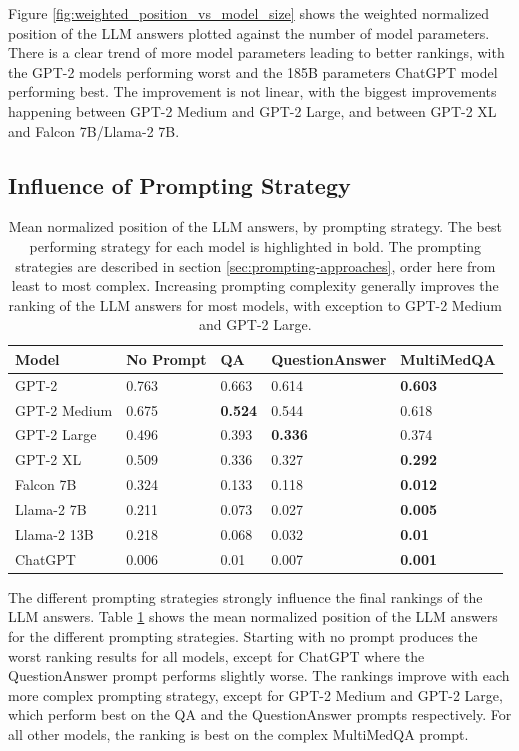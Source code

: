 Figure \ref{fig:weighted_position_vs_model_size} shows the weighted normalized position of the LLM answers plotted against the number of model parameters.
There is a clear trend of more model parameters leading to better rankings, with the GPT-2 models performing worst and the 185B parameters ChatGPT model performing best.
The improvement is not linear, with the biggest improvements happening between GPT-2 Medium and GPT-2 Large, and between GPT-2 XL and Falcon 7B/Llama-2 7B.


\subsection{Influence of Prompting Strategy}
\begin{table}[tb]
\centering
\begin{tabular}{lllll}
\hline
\textbf{Model}        & \textbf{No Prompt} & \textbf{QA}     & \textbf{QuestionAnswer} & \textbf{MultiMedQA} \\\hline
GPT-2        & 0.763      & 0.663 & 0.614    & \textbf{0.603}      \\
GPT-2 Medium & 0.675      & \textbf{0.524} & 0.544    & 0.618      \\
GPT-2 Large  & 0.496      & 0.393 & \textbf{0.336}    & 0.374      \\
GPT-2 XL     & 0.509      & 0.336 & 0.327    & \textbf{0.292}      \\
Falcon 7B    & 0.324      & 0.133 & 0.118    & \textbf{0.012}      \\
Llama-2 7B   & 0.211      & 0.073 & 0.027    & \textbf{0.005}      \\
Llama-2 13B  & 0.218      & 0.068 & 0.032    & \textbf{0.01 }      \\
ChatGPT      & 0.006      & 0.01  & 0.007    & \textbf{0.001}     \\
\hline
\end{tabular}
\caption{Mean normalized position of the LLM answers, by prompting strategy.
The best performing strategy for each model is highlighted in bold.
The prompting strategies are described in section \ref{sec:prompting-approaches}, order here from least to most complex.
Increasing prompting complexity generally improves the ranking of the LLM answers for most models, with exception to GPT-2 Medium and GPT-2 Large.
}
\label{tab:prompting_strategy}
\end{table}
The different prompting strategies strongly influence the final rankings of the LLM answers.
Table \ref{tab:prompting_strategy} shows the mean normalized position of the LLM answers for the different prompting strategies.
Starting with no prompt produces the worst ranking results for all models, except for ChatGPT where the QuestionAnswer prompt performs slightly worse.
The rankings improve with each more complex prompting strategy, except for GPT-2 Medium and GPT-2 Large, which perform best on the QA and the QuestionAnswer prompts respectively.
For all other models, the ranking is best on the complex MultiMedQA prompt.

